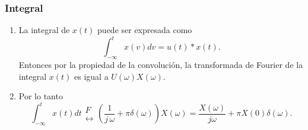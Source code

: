\subsubsection{Integral}

\begin{enumerate}

\item La integral de $x(t)$ puede ser expresada como
\begin{equation}
  \int_{-\infty}^{t} x(v) dv = u(t) * x(t).
\end{equation}
Entonces por la propiedad de la convoluci\'{o}n, la transformada de Fourier de la integral 
$x(t)$ es igual a $U(\omega) X(\omega)$.

\item Por lo tanto
\begin{equation}
\int_{-\infty }^{t}x\left( t\right) dt 
\begin{array}{l}
F \\ 
\leftrightarrow
\end{array}
(\frac{1}{j \, \omega } +\pi \delta(\omega) ) X\left( \omega \right) = 
\frac{X(\omega)}{j \omega} + \pi X(0) \delta(\omega).
\end{equation}

\end{enumerate}

